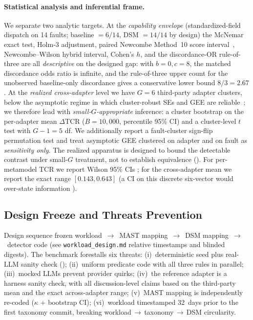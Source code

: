 \documentclass[a4paper,UKenglish,cleveref,autoref,thm-restate]{lipics-v2021}
\begin{document}
\paragraph*{Statistical analysis and inferential frame.}
We separate two analytic targets. At the \emph{capability envelope}
(standardized-field dispatch on 14 faults; baseline $= 6/14$, DSM
$= 14/14$ by design) the McNemar exact test, Holm-3 adjustment,
paired Newcombe Method~10 score interval~\cite{newcombe1998},
Newcombe--Wilson hybrid interval, Cohen's $h$, and the
discordance-OR rule-of-three are all \emph{descriptive} on the
designed gap: with $b=0,c=8$, the matched discordance odds ratio is
infinite, and the rule-of-three upper count for the unobserved
baseline-only discordance gives a conservative lower bound
$8/3=2.67$. At the \emph{realized cross-adapter} level we have
$G = 6$ third-party adapter clusters, below the asymptotic regime
in which cluster-robust SEs and GEE are reliable~\cite{cameron2015};
we therefore lead with \emph{small-$G$-appropriate} inference: a
cluster bootstrap on the per-adapter mean $\Delta\text{TCR}$
($B = 10{,}000$, percentile 95\% CI) and a cluster-level $t$ test with
$G - 1 = 5$ df. We additionally report a fault-cluster sign-flip
permutation test and treat asymptotic GEE clustered on adapter and
on fault as \emph{sensitivity only}. The
realized apparatus is designed to bound the detectable contrast under
small-$G$ treatment, not to establish equivalence
(). For
per-metamodel TCR we report Wilson 95\% CIs \cite{wilson1927}; for
the cross-adapter mean we report the exact range $[0.143, 0.643]$
(a CI on this discrete six-vector would over-state information
\cite{cameron2015}).

\subsection{Design Freeze and Threats Prevention}

Design sequence frozen workload~$\to$~MAST mapping~$\to$~DSM mapping~$\to$~detector code
(see \texttt{workload\_design.md} relative timestamps and blinded
digests).  The benchmark forestalls
six threats: (i)~deterministic seed plus real-LLM sanity check
(); (ii)~uniform predicate code with all
three rules in parallel; (iii)~mocked LLMs prevent provider quirks;
(iv)~the reference adapter is a harness sanity check, with all
discussion-level claims based on the third-party mean and the
exact across-adapter range; (v)~MAST mapping is independently
re-coded ($\kappa$ + bootstrap CI); (vi)~workload timestamped
32~days prior to the first taxonomy commit, breaking
workload\,$\to$\,taxonomy\,$\to$\,DSM circularity.
\end{document}
